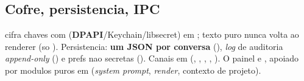 \subsection{Cofre, persistencia, IPC}
 cifra chaves com  (\textbf{DPAPI}/Keychain/libsecret) em ; texto puro nunca volta ao renderer (so ). Persistencia: \textbf{um JSON por conversa} (), \emph{log} de auditoria \emph{append-only}  () e prefs nao secretas (). Canais em  (, , , , ). O painel e , apoiado por modulos puros em  (\emph{system prompt}, \emph{render}, contexto de projeto).
